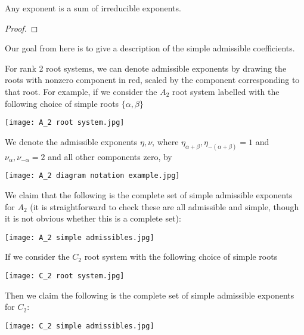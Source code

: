 \begin{proposition}
    Any exponent is a sum of irreducible exponents.
\end{proposition}
\begin{proof}
\end{proof}

Our goal from here is to give a description of the simple admissible coefficients.

\begin{example}
For rank 2 root systems, we can denote admissible exponents by drawing the roots with nonzero component in red, scaled by the component corresponding to that root.
For example, if we consider the $A_2$ root system labelled with the following choice of simple roots $\{\alpha, \beta\}$

\centerline{\texttt{[image: A\_2 root system.jpg]}}

\noindent
We denote the admissible exponents $\eta, \nu$, where $\eta_{\alpha+\beta}, \eta_{-(\alpha+\beta)}=1$ and $\nu_{\alpha}, \nu_{-\alpha}=2$ and all other components zero, by

\centerline{\texttt{[image: A\_2 diagram notation example.jpg]}}

\noindent
We claim that the following is the complete set of simple admissible exponents for $A_2$ 
(it is straightforward to check these are all admissible and simple, though it is not obvious whether this is a complete set):

\centerline{\texttt{[image: A\_2 simple admissibles.jpg]}}

\noindent
If we consider the $C_2$ root system with the following choice of simple roots

\centerline{\texttt{[image: C\_2 root system.jpg]}}

\noindent
Then we claim the following is the complete set of simple admissible exponents for $C_2$:

\centerline{\texttt{[image: C\_2 simple admissibles.jpg]}}

\end{example}